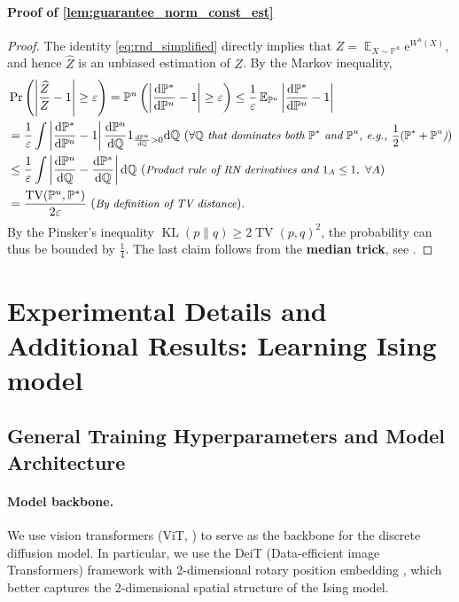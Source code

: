 \documentclass{article}
\theoremstyle{remark}
\newcommand{\ro}[1]{\left(#1\right)} %
\newcommand{\abs}[1]{\left|#1\right|}
\newcommand{\e}{\mathrm{e}}
\renewcommand{\P}{\mathbb{P}}
\newcommand{\E}{\operatorname{\mathbb{E}}}
\renewcommand{\d}{\mathrm{d}}
\newcommand{\de}[2]{\frac{\mathrm{d}#1}{\mathrm{d}#2}} %
\newcommand{\kl}{\operatorname{KL}}
\newcommand{\tv}{\operatorname{TV}}
\newcommand{\Q}{\mathbb{Q}}
\newcommand{\Zh}{\widehat{Z}}
\begin{document}
\paragraph{Proof of \cref{lem:guarantee_norm_const_est}}
\begin{proof}
The identity \cref{eq:rnd_simplified} directly implies that $Z=\E_{X\sim\P^u}\e^{W^u(X)}$, and hence $\Zh$ is an unbiased estimation of $Z$. By the Markov inequality,
\begin{align*}
    &\Pr\ro{\abs{\frac{\Zh}{Z}-1}\ge\varepsilon}=\P^u\ro{\abs{\de{\P^*}{\P^u}-1}\ge\varepsilon}\le\frac{1}{\varepsilon}\E_{\P^u}\abs{\de{\P^*}{\P^u}-1}\\
    &=\frac{1}{\varepsilon}\int\abs{\de{\P^*}{\P^u}-1}\de{\P^u}{\Q}1_{\de{\P^u}{\Q}>0}\d\Q~(\textit{\small$\forall\Q$ that dominates both $\P^*$ and $\P^u$, e.g., $\frac12(\P^*+\P^u$)})\\
    &\le\frac{1}{\varepsilon}\int\abs{\de{\P^u}{\Q}-\de{\P^*}{\Q}}\d\Q~(\textit{\small Product rule of RN derivatives and $1_A\le1,~\forall A$})\\
    &=\frac{\tv(\P^u,\P^*)}{2\varepsilon}~(\textit{\small By definition of TV distance}).
\end{align*}
By the Pinsker's inequality $\kl(p\|q)\ge2\tv(p,q)^2$, the probability can thus be bounded by $\frac14$. The last claim follows from the \textbf{median trick}, see \cite[Lem. 29]{guo2025complexity}.
\end{proof}




\section{Experimental Details and Additional Results: Learning Ising model}
\label{app:exp_ising}

\subsection{General Training Hyperparameters and Model Architecture}
\label{app:exp_ising_train}

\paragraph{Model backbone.} We use vision transformers (ViT, \cite{dosovitskiy2021an}) to serve as the backbone for the discrete diffusion model. In particular, we use the DeiT (Data-efficient image Transformers) framework \cite{touvron2021training} with 2-dimensional rotary position embedding \cite{heo2025rotary}, which better captures the 2-dimensional spatial structure of the Ising model.
\end{document}
